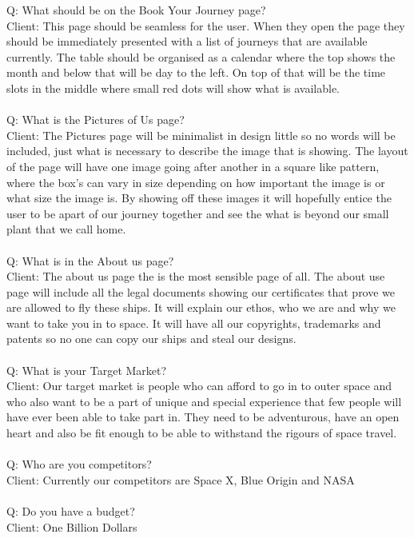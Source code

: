 \documentclass{article}
\begin{document}
Q: What should be on the Book Your Journey page?
\\
Client: This page should be seamless for the user. When they open the page they should be immediately presented with a list of journeys that are available currently. The table should be organised as a  calendar where the top shows the month and below that will be day to the left. On top of that will be the time slots in the middle where small red dots will show what is available. 
\\
\\
Q: What is the Pictures of Us page?
\\
Client: The Pictures page will be minimalist in design little so no words will be included, just what is necessary to describe the image that is showing. The layout of the page will have one image going after another in a square like pattern, where the box's can vary in size depending on how important the image is or what size the image is. By showing off these images it will hopefully entice the user to be apart of our journey together and see the what is beyond our small plant that we call home.
\\
\\
Q: What is in the About us page?
\\
Client: The about us page the is the most sensible page of all. The about use page will include all the legal documents showing our certificates that prove we are allowed to fly these ships. It will explain our ethos, who we are and why we want to take you in to space. It will have all our copyrights, trademarks and patents so no one can copy our ships and steal our designs.
\\
\\
Q: What is your Target Market?
\\
Client: Our target market is people who can afford to go in to outer space and who also want to be a part of unique and special experience that few people will have ever been able to take part in. They need to be adventurous, have an open heart and also be fit enough to be able to withstand the rigours of space travel.
\\
\\
Q: Who are you competitors?
\\
Client: Currently our competitors are Space X, Blue Origin and NASA
\\
\\
Q: Do you have a budget?
\\
Client: One Billion Dollars
\\
\\
\end{document}
